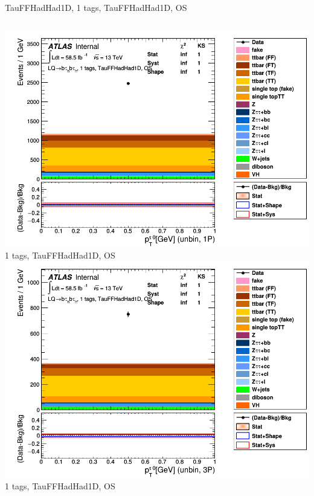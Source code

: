 \begin{frame}{TauFFHadHad1D, 1 tags, TauFFHadHad1D, OS}
\begin{columns}[c]
    \centering\includegraphics[width=\textwidth]{C_1tag2pjet_0ptv_OS_UnbinLeadTau1P}\\
    1 tags, TauFFHadHad1D, OS
    \centering\includegraphics[width=\textwidth]{C_1tag2pjet_0ptv_OS_UnbinLeadTau3P}\\
    1 tags, TauFFHadHad1D, OS
  \end{columns}
\end{frame}

